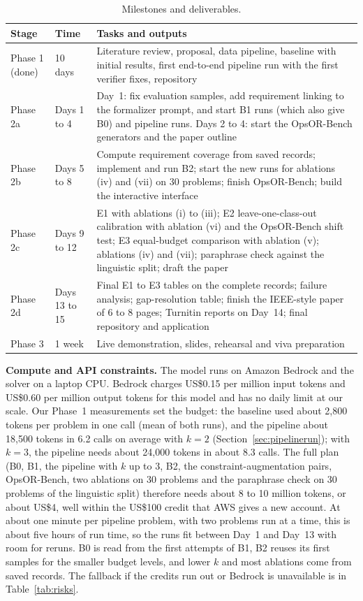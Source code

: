 \documentclass[11pt,a4paper]{article}
\begin{document}
\begin{table}[htbp]
\centering
\caption{Milestones and deliverables.}
\label{tab:milestones}
\small
\begin{tabularx}{\textwidth}{@{}P{2.3cm}P{2.0cm}Y@{}}
\toprule
\textbf{Stage} & \textbf{Time} & \textbf{Tasks and outputs}\\
\midrule
Phase 1 (done) & 10 days & Literature review, proposal, data pipeline, baseline with initial results, first end-to-end pipeline run with the first verifier fixes, repository\\
Phase 2a & Days 1 to 4 & Day~1: fix evaluation samples, add requirement linking to the formalizer prompt, and start B1 runs (which also give B0) and pipeline runs. Days 2 to 4: start the OpsOR-Bench generators and the paper outline\\
Phase 2b & Days 5 to 8 & Compute requirement coverage from saved records; implement and run B2; start the new runs for ablations (iv) and (vii) on 30 problems; finish OpsOR-Bench; build the interactive interface\\
Phase 2c & Days 9 to 12 & E1 with ablations (i) to (iii); E2 leave-one-class-out calibration with ablation (vi) and the OpsOR-Bench shift test; E3 equal-budget comparison with ablation (v); ablations (iv) and (vii); paraphrase check against the linguistic split; draft the paper\\
Phase 2d & Days 13 to 15 & Final E1 to E3 tables on the complete records; failure analysis; gap-resolution table; finish the IEEE-style paper of 6 to 8 pages; Turnitin reports on Day~14; final repository and application\\
Phase 3 & 1 week & Live demonstration, slides, rehearsal and viva preparation\\
\bottomrule
\end{tabularx}
\end{table}

\textbf{Compute and API constraints.} The model runs on Amazon Bedrock and the solver on a laptop CPU. Bedrock charges US\$0.15 per million input tokens and US\$0.60 per million output tokens for this model and has no daily limit at our scale. Our Phase~1 measurements set the budget: the baseline used about 2,800 tokens per problem in one call (mean of both runs), and the pipeline about 18,500 tokens in 6.2 calls on average with $k = 2$ (Section~\ref{sec:pipelinerun}); with $k = 3$, the pipeline needs about 24,000 tokens in about 8.3 calls. The full plan (B0, B1, the pipeline with $k$ up to 3, B2, the constraint-augmentation pairs, OpsOR-Bench, two ablations on 30 problems and the paraphrase check on 30 problems of the linguistic split) therefore needs about 8 to 10 million tokens, or about US\$4, well within the US\$100 credit that AWS gives a new account. At about one minute per pipeline problem, with two problems run at a time, this is about five hours of run time, so the runs fit between Day~1 and Day~13 with room for reruns. B0 is read from the first attempts of B1, B2 reuses its first samples for the smaller budget levels, and lower $k$ and most ablations come from saved records. The fallback if the credits run out or Bedrock is unavailable is in Table~\ref{tab:risks}.
\end{document}
